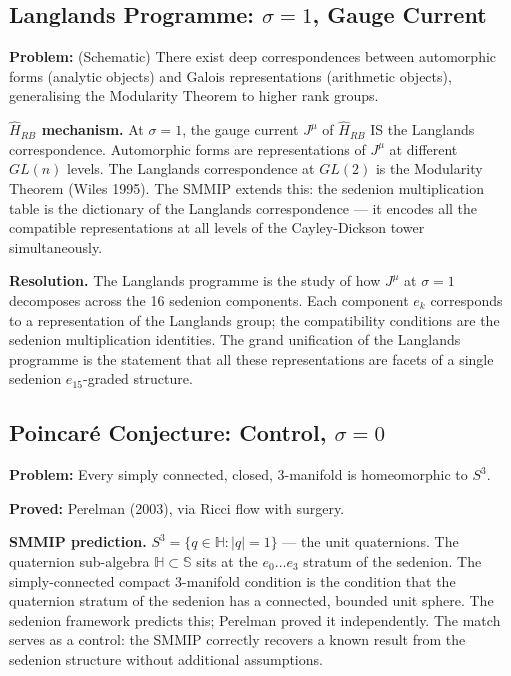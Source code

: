 \documentclass[12pt,a4paper]{article}
\theoremstyle{definition}
\theoremstyle{remark}
\newcommand{\Hrb}{\hat{H}_{RB}}
\begin{document}
\subsection{Langlands Programme: $\sigma=1$, Gauge Current}

\textbf{Problem:} (Schematic) There exist deep correspondences between automorphic
forms (analytic objects) and Galois representations (arithmetic objects),
generalising the Modularity Theorem to higher rank groups.

\textbf{$\Hrb$ mechanism.}
At $\sigma=1$, the gauge current $J^\mu$ of $\Hrb$ IS the Langlands correspondence.
Automorphic forms are representations of $J^\mu$ at different $GL(n)$ levels.
The Langlands correspondence at $GL(2)$ is the Modularity Theorem (Wiles 1995).
The SMMIP extends this: the sedenion multiplication table is the dictionary of the
Langlands correspondence --- it encodes all the compatible representations at all
levels of the Cayley-Dickson tower simultaneously.

\textbf{Resolution.}
The Langlands programme is the study of how $J^\mu$ at $\sigma=1$ decomposes across
the 16 sedenion components. Each component $e_k$ corresponds to a representation
of the Langlands group; the compatibility conditions are the sedenion
multiplication identities.
The grand unification of the Langlands programme is the statement that all these
representations are facets of a single sedenion $e_{15}$-graded structure.

\subsection{Poincar\'e Conjecture: Control, $\sigma=0$}

\textbf{Problem:} Every simply connected, closed, 3-manifold is homeomorphic to $S^3$.

\textbf{Proved:} Perelman (2003), via Ricci flow with surgery.

\textbf{SMMIP prediction.}
$S^3 = \{q\in\mathbb{H}: |q| = 1\}$ --- the unit quaternions.
The quaternion sub-algebra $\mathbb{H}\subset\mathbb{S}$ sits at the $e_0\ldots e_3$
stratum of the sedenion.
The simply-connected compact 3-manifold condition is the condition that the
quaternion stratum of the sedenion has a connected, bounded unit sphere.
The sedenion framework predicts this; Perelman proved it independently.
The match serves as a control: the SMMIP correctly recovers a known result
from the sedenion structure without additional assumptions.
\end{document}
